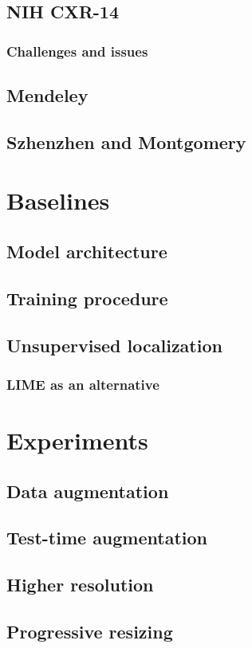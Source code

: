 \documentclass[11pt,twoside,a4paper]{report}
\begin{document}
    \section{NIH CXR-14}
        \subsection{Challenges and issues}
    \section{Mendeley}
    \section{Szhenzhen and Montgomery}
\chapter{Baselines}
    \section{Model architecture}
    \section{Training procedure}
    \section{Unsupervised localization}
        \subsection{LIME as an alternative}
\chapter{Experiments}
    \section{Data augmentation}
    \section{Test-time augmentation}
    \section{Higher resolution}
    \section{Progressive resizing}
\end{document}
